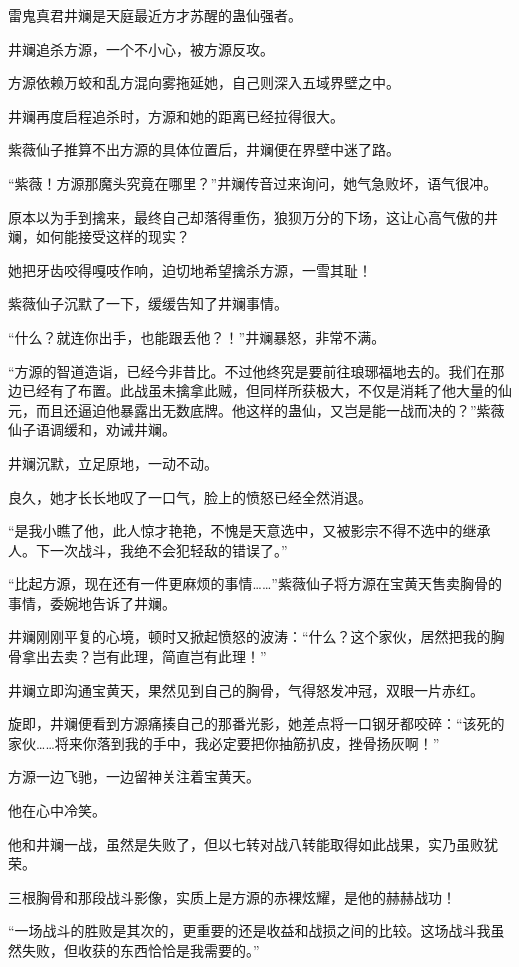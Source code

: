 \begin{this_body}
雷鬼真君井斓是天庭最近方才苏醒的蛊仙强者。

井斓追杀方源，一个不小心，被方源反攻。

方源依赖万蛟和乱方混向雾拖延她，自己则深入五域界壁之中。

井斓再度启程追杀时，方源和她的距离已经拉得很大。

紫薇仙子推算不出方源的具体位置后，井斓便在界壁中迷了路。

“紫薇！方源那魔头究竟在哪里？”井斓传音过来询问，她气急败坏，语气很冲。

原本以为手到擒来，最终自己却落得重伤，狼狈万分的下场，这让心高气傲的井斓，如何能接受这样的现实？

她把牙齿咬得嘎吱作响，迫切地希望擒杀方源，一雪其耻！

紫薇仙子沉默了一下，缓缓告知了井斓事情。

“什么？就连你出手，也能跟丢他？！”井斓暴怒，非常不满。

“方源的智道造诣，已经今非昔比。不过他终究是要前往琅琊福地去的。我们在那边已经有了布置。此战虽未擒拿此贼，但同样所获极大，不仅是消耗了他大量的仙元，而且还逼迫他暴露出无数底牌。他这样的蛊仙，又岂是能一战而决的？”紫薇仙子语调缓和，劝诫井斓。

井斓沉默，立足原地，一动不动。

良久，她才长长地叹了一口气，脸上的愤怒已经全然消退。

“是我小瞧了他，此人惊才艳艳，不愧是天意选中，又被影宗不得不选中的继承人。下一次战斗，我绝不会犯轻敌的错误了。”

“比起方源，现在还有一件更麻烦的事情……”紫薇仙子将方源在宝黄天售卖胸骨的事情，委婉地告诉了井斓。

井斓刚刚平复的心境，顿时又掀起愤怒的波涛：“什么？这个家伙，居然把我的胸骨拿出去卖？岂有此理，简直岂有此理！”

井斓立即沟通宝黄天，果然见到自己的胸骨，气得怒发冲冠，双眼一片赤红。

旋即，井斓便看到方源痛揍自己的那番光影，她差点将一口钢牙都咬碎：“该死的家伙……将来你落到我的手中，我必定要把你抽筋扒皮，挫骨扬灰啊！”

方源一边飞驰，一边留神关注着宝黄天。

他在心中冷笑。

他和井斓一战，虽然是失败了，但以七转对战八转能取得如此战果，实乃虽败犹荣。

三根胸骨和那段战斗影像，实质上是方源的赤裸炫耀，是他的赫赫战功！

“一场战斗的胜败是其次的，更重要的还是收益和战损之间的比较。这场战斗我虽然失败，但收获的东西恰恰是我需要的。”


\end{this_body}
